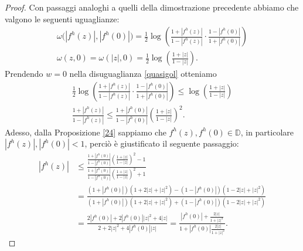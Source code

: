 \begin{proof}
  Con passaggi analoghi a quelli della dimostrazione precedente abbiamo che valgono le seguenti uguaglianze:
  \begin{gather*}
    \omega\bigl(|f^h(z)|,|f^h(0)|\bigr)=\frac{1}{2}\log\left(\frac{1+|f^h(z)|}{1-|f^h(z)|}\cdot\frac{1-|f^h(0)|}{1+|f^h(0)|}\right)\\
    \omega(z, 0)=\omega(|z|,0)=\frac{1}{2}\log\left(\frac{1+|z|}{1-|z|}\right).
  \end{gather*}
  Prendendo $w=0$ nella disuguaglianza \eqref{quasigol} otteniamo
  \begin{align}
    \nonumber \frac{1}{2}\log\left(\frac{1+|f^h(z)|}{1-|f^h(z)|}\cdot\frac{1-|f^h(0)|}{1+|f^h(0)|}\right) \le \log\left(\frac{1+|z|}{1-|z|}\right) \\
    \frac{1+|f^h(z)|}{1-|f^h(z)|} \le \frac{1+|f^h(0)|}{1-|f^h(0)|}\left(\frac{1+|z|}{1-|z|}\right)^2. \label{golprimo}
  \end{align}
  Adesso, dalla Proposizione \ref{24} sappiamo che $f^h(z),f^h(0) \in \mathbb{D}$, in particolare $|f^h(z)|,|f^h(0)|<1$, perciò è giustificato il seguente passaggio:
  \begin{align*}
    |f^h(z)| & \le \frac{\frac{1+|f^h(0)|}{1-|f^h(0)|}\left(\frac{1+|z|}{1-|z|}\right)^2-1}{\frac{1+|f^h(0)|}{1-|f^h(0)|}\left(\frac{1+|z|}{1-|z|}\right)^2+1} \\
    & =\frac{(1+|f^h(0)|)(1+2|z|+|z|^2)-(1-|f^h(0)|)(1-2|z|+|z|^2)}{(1+|f^h(0)|)(1+2|z|+|z|^2)+(1-|f^h(0)|)(1-2|z|+|z|^2)} \\
    & =\frac{2|f^h(0)|+2|f^h(0)||z|^2+4|z|}{2+2|z|^2+4|f^h(0)||z|}=\frac{|f^h(0)|+\frac{2|z|}{1+|z|^2}}{1+|f^h(0)|\frac{2|z|}{1+|z|^2}}.
  \end{align*}
\end{proof}
